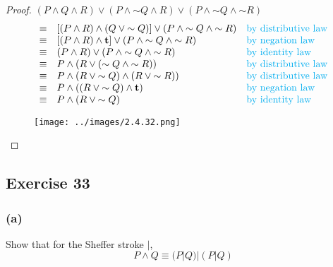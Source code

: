 \documentclass[14pt]{extarticle}
\newcommand{\true}{{\bf t}}
\begin{document}
\begin{proof}
    $(P \wedge Q \wedge R) \vee (P \wedge {\sim Q} \wedge R) \vee (P
        \wedge {\sim Q}\wedge {\sim R})$
    $$
        \begin{array}{cll}
            \equiv & [(P \wedge R) \wedge (Q \vee {\sim Q})] \vee (P \wedge {\sim Q}\wedge {\sim R}) & \text{\color{cyan}by distributive law} \\
            \equiv & [(P \wedge R) \wedge \true] \vee (P \wedge {\sim Q}\wedge {\sim R})             & \text{\color{cyan}by negation law}     \\
            \equiv & (P \wedge R) \vee (P \wedge {\sim Q}\wedge {\sim R})                            &
            \text{\color{cyan}by identity law}                                                                                                \\
            \equiv & P \wedge (R \vee ({\sim Q} \wedge {\sim R}))                                    & \text{\color{cyan}by distributive law} \\
            \equiv & P \wedge (R \vee {\sim Q}) \wedge (R \vee {\sim R}))                            & \text{\color{cyan}by distributive law} \\
            \equiv & P \wedge ((R \vee {\sim Q}) \wedge \true)                                       & \text{\color{cyan}by negation law}     \\
            \equiv & P \wedge (R \vee {\sim Q})                                                      & \text{\color{cyan}by
            identity law}                                                                                                                     \\
        \end{array}
    $$
    \begin{figure}[ht!]
        \centering
        \texttt{[image: ../images/2.4.32.png]}
    \end{figure}
\end{proof}

\subsection{Exercise 33}
\subsubsection{(a)}
Show that for the Sheffer stroke $|$,
$$
    P \wedge Q \equiv (P | Q) | (P | Q)
$$
\end{document}
